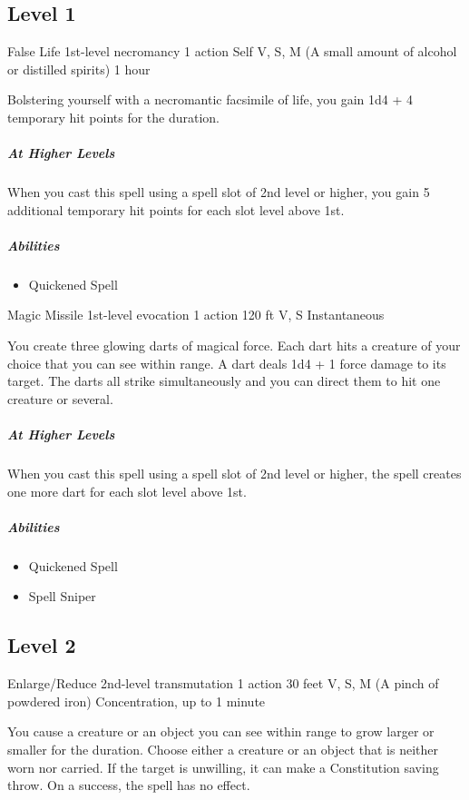 \documentclass[a4paper,openany,twocolumn]{book}
\begin{document}
\subsection*{Level 1}

\DndSpellHeader
  {False Life}
  {1st-level necromancy}
  {1 action}
  {Self}
  {V, S, M (A small amount of alcohol or distilled spirits)}
  {1 hour}

Bolstering yourself with a necromantic facsimile of life, you gain 1d4 + 4 temporary hit points for the duration.
    
\subparagraph*{At Higher Levels} When you cast this spell using a spell slot of 2nd level or higher, you gain 5 additional temporary hit points for each slot level above 1st.

\subparagraph*{Abilities}
\begin{itemize}
  \item Quickened Spell
\end{itemize}

\DndSpellHeader
  {Magic Missile}
  {1st-level evocation}
  {1 action}
  {120 ft}
  {V, S}
  {Instantaneous}

You create three glowing darts of magical force. Each dart hits a creature of your choice that you can see within range. A dart deals 1d4 + 1 force damage to its target. The darts all strike simultaneously and you can direct them to hit one creature or several.

\subparagraph{At Higher Levels} When you cast this spell using a spell slot of 2nd level or higher, the spell creates one more dart for each slot level above 1st.

\subparagraph*{Abilities}
\begin{itemize} 
  \item Quickened Spell
  \item Spell Sniper
\end{itemize}

\subsection*{Level 2}

\DndSpellHeader
  {Enlarge/Reduce}
  {2nd-level transmutation}
  {1 action}
  {30 feet}
  {V, S, M (A pinch of powdered iron)}
  {Concentration, up to 1 minute}

You cause a creature or an object you can see within range to grow larger or smaller for the duration. Choose either a creature or an object that is neither worn nor carried. If the target is unwilling, it can make a Constitution saving throw. On a success, the spell has no effect. 
    
\end{document}
